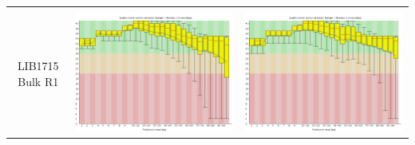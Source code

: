 \begin{center}
\begin{tabular}{ccc}
\midrule 
\\
\begin{sideways}LIB1715 Bulk R1\end{sideways} & \includegraphics[width=0.4 \textwidth]{Appendices/images/Sample_LIB1715_base_quality_R1.png} & \includegraphics[width=0.4 \textwidth]{Appendices/images/Sample_LIB1715_base_quality_R2.png} \\
\midrule

\end{tabular}
\end{center}
